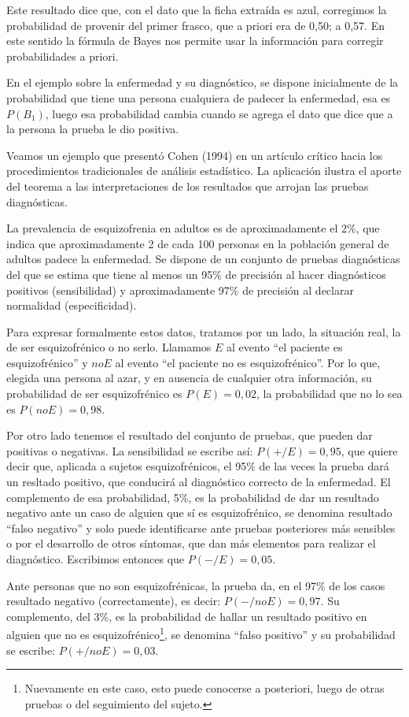 \documentclass[]{book}
\let\rmarkdownfootnote\footnote%
\def\footnote{\protect\rmarkdownfootnote}
\begin{document}
Este resultado dice que, con el dato que la ficha extraída es azul, corregimos la probabilidad de provenir del primer frasco, que a priori era de 0,50; a 0,57. En este sentido la fórmula de Bayes nos permite usar la información para corregir probabilidades a priori.

En el ejemplo sobre la enfermedad y su diagnóstico, se dispone
inicialmente de la probabilidad que tiene una persona cualquiera de
padecer la enfermedad, esa es \(P(B_{1})\), luego esa probabilidad cambia cuando se agrega el dato que dice que a la persona la prueba le dio positiva.

Veamos un ejemplo que presentó Cohen (1994) en un artículo crítico hacia los procedimientos tradicionales de análisis estadístico. La aplicación ilustra el aporte del teorema a las interpretaciones de los resultados que arrojan las pruebas diagnósticas.

La prevalencia de esquizofrenia en adultos es de aproximadamente el 2\%, que indica que aproximadamente 2 de cada 100 personas en la población general de adultos padece la enfermedad. Se dispone de un conjunto de pruebas diagnósticas del que se estima que tiene al menos un 95\% de precisión al hacer diagnósticos positivos (sensibilidad) y
aproximadamente 97\% de precisión al declarar normalidad (especificidad).

Para expresar formalmente estos datos, tratamos por un lado, la
situación real, la de ser esquizofrénico o no serlo. Llamamos \(E\) al
evento ``el paciente es esquizofrénico'' y \(noE\) al evento ``el paciente no es esquizofrénico''. Por lo que, elegida una persona al azar, y en ausencia de cualquier otra información, su probabilidad de ser esquizofrénico es \(P(E)=0,02\), la probabilidad que no lo sea es \(P(noE)=0,98\).

Por otro lado tenemos el resultado del conjunto de pruebas, que pueden dar positivas o negativas. La sensibilidad se escribe así:
\(P(+/E)=0,95\), que quiere decir que, aplicada a sujetos esquizofrénicos, el 95\% de las veces la prueba dará un resltado positivo, que conducirá al diagnóstico correcto de la enfermedad. El complemento de esa probabilidad, 5\%, es la probabilidad de dar un resultado negativo ante un caso de alguien que sí es esquizofrénico, se denomina resultado ``falso negativo'' y solo puede identificarse ante pruebas posteriores más sensibles o por el desarrollo de otros síntomas, que dan más elementos para realizar el diagnóstico. Escribimos entonces que \(P(-/E)=0,05\).

Ante personas que no son esquizofrénicas, la prueba da, en el 97\% de los casos resultado negativo (correctamente), es decir: \(P(-/noE)=0,97\). Su complemento, del 3\%, es la probabilidad de hallar un resultado positivo en alguien que no es esquizofrénico\footnote{Nuevamente en este caso, esto puede conocerse a posteriori, luego de otras pruebas o del seguimiento del sujeto.}, se denomina ``falso positivo'' y su probabilidad se escribe: \(P(+/noE)=0,03\).
\end{document}

